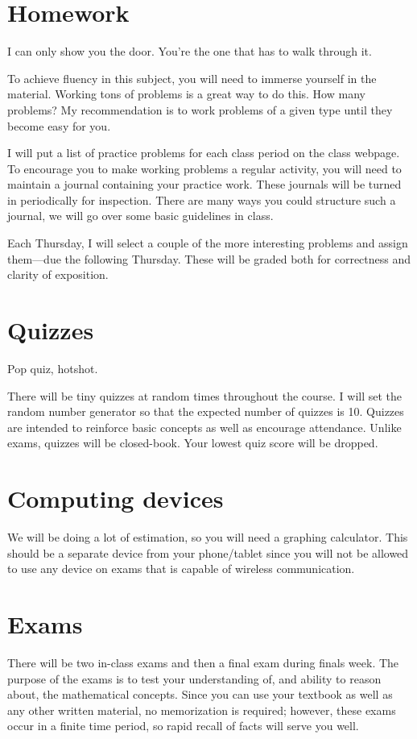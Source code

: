 \documentclass[12pt]{article}
\begin{document}
\section*{Homework} 
\epigraph{I can only show you the door. You're the one that has to walk through it.}{}
To achieve fluency in this subject, you will need to immerse yourself in the material.  
Working tons of problems is a great way to do this.  How many problems?  
My recommendation is to work problems of a given type until they become easy for you.

I will put a list of practice problems for each class period on the class webpage. 
To encourage you to make working problems a regular activity, you will need to maintain a journal containing your practice work.
These journals will be turned in periodically for inspection.  There are many ways you could structure such a journal, we will go over some
basic guidelines in class.

Each Thursday, I will select a couple of the more interesting problems and assign them---due the following Thursday.
These will be graded both for correctness and clarity of exposition.
\newpage
\section*{Quizzes}
\epigraph{Pop quiz, hotshot.}{}
There will be tiny quizzes at random times throughout the course.  I will set the random number generator so that the expected number of quizzes is 10.
Quizzes are intended to reinforce basic concepts as well as encourage attendance.
Unlike exams, quizzes will be closed-book.  Your lowest quiz score will be dropped.

\section*{Computing devices}
We will be doing a lot of estimation, so you will need a graphing calculator.  This should be a separate device from your phone/tablet since you will not be allowed to use any device on exams that is capable of wireless communication.

\section*{Exams}
There will be two in-class exams and then a final exam during finals week. 
The purpose of the exams is to test your understanding of, and ability to reason about, the mathematical concepts. Since you can use your textbook as well as any other written material, no memorization is required; however, these exams occur in a finite time period, so rapid recall of facts will serve you well. 
\end{document}
